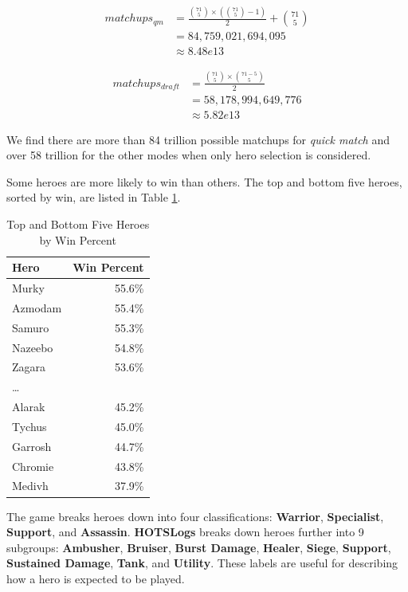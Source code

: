 \documentclass[twoside,twocolumn]{article}
\begin{document}
\begin{equation}
\label{equation:qmmatchups}
\begin{aligned}
matchups_{qm} &= \frac{{71 \choose 5}\times({71 \choose 5}-1)}{2} + {71 \choose 5} \\
&= 84,759,021,694,095 \\
&\approx{8.48e13}
\end{aligned}
\end{equation}

\begin{equation}
\label{equation:draftmatchups}
\begin{aligned}
matchups_{draft} &= \frac{{71 \choose 5}\times{71-5 \choose 5}}{2} \\
&= 58,178,994,649,776 \\
&\approx{5.82e13}
\end{aligned}
\end{equation}

We find there are more than 84 trillion possible matchups for \textit{quick match} and over 58 trillion for the other modes when only hero selection is considered.

Some heroes are more likely to win than others.  The top and bottom five heroes, sorted by win, are listed in Table \ref{table:winpercent}.

\begin{table}[h]
\caption{Top and Bottom Five Heroes by Win Percent}
\label{table:winpercent}
\centering
\begin{tabular}{lr}
\toprule
Hero & Win Percent \\
\midrule
Murky & 55.6\% \\
Azmodam & 55.4\% \\
Samuro & 55.3\% \\
Nazeebo & 54.8\% \\
Zagara & 53.6\% \\
\dots \\
Alarak & 45.2\% \\
Tychus & 45.0\% \\
Garrosh & 44.7\% \\
Chromie & 43.8\% \\
Medivh & 37.9\% \\
\bottomrule
\end{tabular}
\end{table}


The game breaks heroes down into four classifications: \textbf{Warrior}, \textbf{Specialist}, \textbf{Support}, and \textbf{Assassin}.  \textbf{HOTSLogs} breaks down heroes further into 9 subgroups:  \textbf{Ambusher},  \textbf{Bruiser},  \textbf{Burst Damage},  \textbf{Healer},  \textbf{Siege},  \textbf{Support},  \textbf{Sustained Damage},  \textbf{Tank}, and  \textbf{Utility}.  These labels are useful for describing how a hero is expected to be played.  
\end{document}
